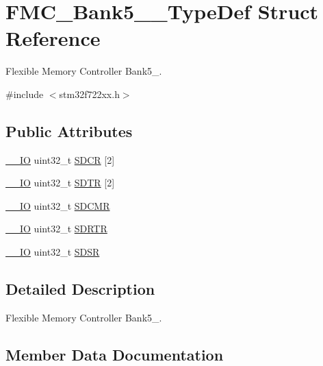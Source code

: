 \hypertarget{struct_f_m_c___bank5__6___type_def}{}\section{F\+M\+C\+\_\+\+Bank5\+\_\+\_\+\+Type\+Def Struct Reference}
\label{struct_f_m_c___bank5__6___type_def}


Flexible Memory Controller Bank5\+\_.  




{\ttfamily \#include $<$stm32f722xx.\+h$>$}

\subsection*{Public Attributes}
\begin{DoxyCompactItemize}
\item 
\mbox{\hyperlink{core__sc300_8h_aec43007d9998a0a0e01faede4133d6be}{\+\_\+\+\_\+\+IO}} uint32\+\_\+t \mbox{\hyperlink{struct_f_m_c___bank5__6___type_def_a252c4ada37ac883b8e4fe0b08c781d0b}{S\+D\+CR}} \mbox{[}2\mbox{]}
\item 
\mbox{\hyperlink{core__sc300_8h_aec43007d9998a0a0e01faede4133d6be}{\+\_\+\+\_\+\+IO}} uint32\+\_\+t \mbox{\hyperlink{struct_f_m_c___bank5__6___type_def_a8438638391415aaa0dc96714f28915ae}{S\+D\+TR}} \mbox{[}2\mbox{]}
\item 
\mbox{\hyperlink{core__sc300_8h_aec43007d9998a0a0e01faede4133d6be}{\+\_\+\+\_\+\+IO}} uint32\+\_\+t \mbox{\hyperlink{struct_f_m_c___bank5__6___type_def_ad328f49a71561cd3f159af6faf65a641}{S\+D\+C\+MR}}
\item 
\mbox{\hyperlink{core__sc300_8h_aec43007d9998a0a0e01faede4133d6be}{\+\_\+\+\_\+\+IO}} uint32\+\_\+t \mbox{\hyperlink{struct_f_m_c___bank5__6___type_def_ac1887d031d16c1bf2c0a51ee9001f886}{S\+D\+R\+TR}}
\item 
\mbox{\hyperlink{core__sc300_8h_aec43007d9998a0a0e01faede4133d6be}{\+\_\+\+\_\+\+IO}} uint32\+\_\+t \mbox{\hyperlink{struct_f_m_c___bank5__6___type_def_a9f268f86cf706c2c78d8a6a9fbe9d9a3}{S\+D\+SR}}
\end{DoxyCompactItemize}


\subsection{Detailed Description}
Flexible Memory Controller Bank5\+\_. 

\subsection{Member Data Documentation}
\mbox{\label{struct_f_m_c___bank5__6___type_def_ad328f49a71561cd3f159af6faf65a641}} 
